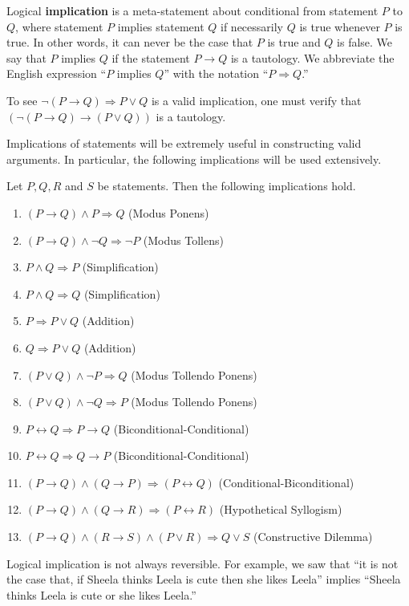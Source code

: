 \documentclass[]{article}
\begin{document}
\begin{defn}[Implication] Logical \textbf{implication} is a meta-statement about conditional from statement $P$ to $Q$, where statement $P$ implies statement $Q$ if necessarily $Q$ is true whenever $P$ is true. In other words, it can never be the case that $P$ is true and $Q$ is false. We say that $P$ implies $Q$ if the statement $P \rightarrow Q$ is a tautology. We abbreviate the English expression ``$P$ implies $Q$'' with the notation ``$P \Rightarrow Q$.'' 
\end{defn}
\begin{exmp} To see $\neg (P \rightarrow Q) \Rightarrow P \vee Q$ is a valid implication, one must verify that $(\neg (P \rightarrow Q) \rightarrow (P \vee Q))$ is a tautology.
\end{exmp}
Implications of statements will be extremely useful in constructing valid arguments. In particular, the following implications will be used extensively. 

\begin{thm}[Implications] Let $P,Q,R$ and $S$ be statements. Then the following implications hold.		
		\begin{enumerate}
			\item $(P\rightarrow Q)\wedge  P\Rightarrow Q$  (Modus Ponens)
			\item $(P\rightarrow Q)\wedge\neg Q\Rightarrow\neg P$ (Modus Tollens)
			\item $P\wedge Q\Rightarrow P$ (Simplification)
			\item $P\wedge Q\Rightarrow Q$ (Simplification)
			\item $P\Rightarrow P\vee Q$ (Addition)
			\item $Q\Rightarrow P\vee Q$ (Addition)
			\item $(P\vee Q)\wedge \neg P\Rightarrow Q$ (Modus Tollendo Ponens)
			\item $(P\vee Q)\wedge \neg Q\Rightarrow P$ (Modus Tollendo Ponens) 
			\item $P\leftrightarrow Q\Rightarrow P\rightarrow Q$ (Biconditional-Conditional)
			\item $P\leftrightarrow Q\Rightarrow Q\rightarrow P$ (Biconditional-Conditional)
			\item $(P\rightarrow Q)\wedge(Q\rightarrow P)\Rightarrow(P\leftrightarrow Q)$ (Conditional-Biconditional)
			\item $(P\rightarrow Q)\wedge(Q\rightarrow R)\Rightarrow(P\leftrightarrow R)$ (Hypothetical Syllogism)
			\item $(P\rightarrow Q)\wedge(R\rightarrow S)\wedge(P\vee R)\Rightarrow Q\vee S$ (Constructive Dilemma)			
		\end{enumerate}	
\end{thm}
\begin{rem} Logical implication is not always reversible. For example, we saw that “it is not the case that, if Sheela thinks Leela is cute then she likes Leela” implies “Sheela thinks Leela is cute or she likes Leela.”
\end{rem}
\end{document}
